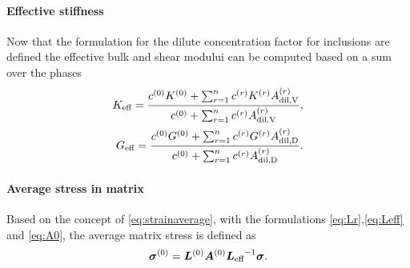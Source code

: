 \paragraph{Effective stiffness}
Now that the formulation for the dilute concentration factor for inclusions are defined the effective bulk and shear modului can be computed based on a sum over the phases
\begin{align}
K_{\text{eff}} = \dfrac{c^{(0)}K^{(0)} + \sum^{n}_{r=1} c^{(r)} K^{(r)} A^{(r)}_{\text{dil,V}}}{c^{(0)} + \sum^{n}_{r=1} c^{(r)} A^{(r)}_{\text{dil,V}}},\label{eq:keff} \\
G_{\text{eff}} = \dfrac{c^{(0)}G^{(0)} + \sum^{n}_{r=1} c^{(r)} G^{(r)} A^{(r)}_{\text{dil,D}}}{c^{(0)} + \sum^{n}_{r=1} c^{(r)} A^{(r)}_{\text{dil,D}}}.\label{eq:geff}
\end{align}
\paragraph{Average stress in matrix}

Based on the concept of \eqref{eq:strainaverage}, with the formulations \eqref{eq:Lr},\eqref{eq:Leff} and \eqref{eq:A0}, the average matrix stress is defined as 
\begin{align}
\boldsymbol{\sigma}^{(0)} = \boldsymbol{L}^{(0)}\boldsymbol{A}^{(0)} {\boldsymbol{L}_{\text{eff}}}^{-1}\boldsymbol{\sigma}. \label{eq:matrixstress}
\end{align}


